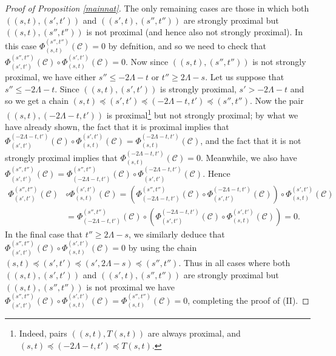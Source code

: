 \documentclass[11pt]{amsart}
\theoremstyle{definition}
\theoremstyle{remark}
\numberwithin{equation}{section}
\begin{document}
\begin{proof}[Proof of Proposition \ref{mainnat}]
The only remaining cases are those in which both $\left((s,t),(s',t')\right)$ and $\left((s',t),(s'',t'')\right)$ are strongly proximal but $\left((s,t),(s'',t'')\right)$ is not proximal (and hence also not strongly proximal).  In this case $\Phi_{(s,t)}^{(s'',t'')}(\mathcal{C})=0$ by defnition, and so we need to check that $\Phi_{(s',t')}^{(s'',t'')}(\mathcal{C}) \circ
\Phi_{(s,t)}^{(s',t')}(\mathcal{C})=0$. Now since $((s,t),(s'',t''))$ is not strongly proximal, we have either $s''\leq -2\Lambda-t$ or $t''\geq 2\Lambda-s$.  Let us suppose that $s''\leq -2\Lambda-t$.  Since $((s,t),(s',t'))$ is strongly proximal, $s'>-2\Lambda-t$ and so we get a chain $(s,t)\preceq(s',t')\preceq (-2\Lambda-t,t')\preceq (s'',t'')$.  Now the pair $((s,t),(-2\Lambda-t,t'))$ is proximal\footnote{Indeed, pairs $((s,t),T(s,t))$ are always proximal, and $(s,t)\preceq (-2\Lambda-t,t')\preceq T(s,t)$.} but not strongly proximal; by what we have already shown, the fact that it is proximal implies that $\Phi_{(s',t')}^{(-2\Lambda-t,t')}(\mathcal{C})\circ \Phi_{(s,t)}^{(s',t')}(\mathcal{C})=\Phi_{(s,t)}^{(-2\Lambda-t,t')}(\mathcal{C})$, and the fact that it is not strongly proximal implies that $\Phi_{(s,t)}^{(-2\Lambda-t,t')}(\mathcal{C})=0$.  Meanwhile, we also have $\Phi_{(s',t')}^{(s'',t'')}(\mathcal{C})=\Phi_{(-2\Lambda-t,t')}^{(s'',t'')}(\mathcal{C})\circ \Phi_{(s',t')}^{(-2\Lambda-t,t')}(\mathcal{C})$.  Hence \begin{align*}
	\Phi_{(s',t')}^{(s'',t'')}(\mathcal{C}) &\circ
	\Phi_{(s,t)}^{(s',t')}(\mathcal{C})= \left(\Phi_{(-2\Lambda-t,t')}^{(s'',t'')}(\mathcal{C})\circ \Phi_{(s',t')}^{(-2\Lambda-t,t')}(\mathcal{C})\right)\circ \Phi_{(s,t)}^{(s',t')}(\mathcal{C}) \\ & = \Phi_{(-2\Lambda-t,t')}^{(s'',t'')}(\mathcal{C})\circ \left(\Phi_{(s',t')}^{(-2\Lambda-t,t')}(\mathcal{C})\circ \Phi_{(s,t)}^{(s',t')}(\mathcal{C}) \right)=0.
\end{align*}
In the final case that $t''\geq 2\Lambda-s$, we similarly deduce that $\Phi_{(s',t')}^{(s'',t'')}(\mathcal{C}) \circ
\Phi_{(s,t)}^{(s',t')}(\mathcal{C})=0$ by using the chain $(s,t)\preceq (s',t')\preceq (s',2\Lambda-s)\preceq (s'',t'')$.  Thus in all cases where both $\left((s,t),(s',t')\right)$ and $\left((s',t),(s'',t'')\right)$ are strongly proximal but $\left((s,t),(s'',t'')\right)$ is not proximal we have $\Phi_{(s',t')}^{(s'',t'')}(\mathcal{C}) \circ
\Phi_{(s,t)}^{(s',t')}(\mathcal{C})=\Phi_{(s,t)}^{(s'',t'')}(\mathcal{C})=0$, completing the proof of (II).


  
\end{proof}
\end{document}

